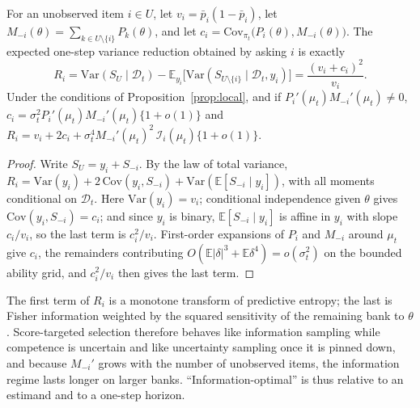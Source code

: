 \begin{proposition}\label{prop:evr}
For an unobserved item $i\in U$, let $v_i=\bar p_i(1-\bar p_i)$, let
$M_{-i}(\theta)=\sum_{k\in U\setminus\{i\}}P_k(\theta)$, and let
$c_i=\mathrm{Cov}_{\pi_t}\big(P_i(\theta),M_{-i}(\theta)\big)$. The expected one-step
variance reduction obtained by asking $i$ is exactly
\begin{equation}\label{eq:evr}
R_i=\mathrm{Var}(S_U\mid\mathcal D_t)-\mathbb E_{y_i}\big[\mathrm{Var}(S_{U\setminus\{i\}}\mid\mathcal D_t,y_i)\big]
=\frac{(v_i+c_i)^2}{v_i}.
\end{equation}
Under the conditions of Proposition~\ref{prop:local}, and if $P_i'(\mu_t)M_{-i}'(\mu_t)\neq0$,
$c_i=\sigma_t^2P_i'(\mu_t)M_{-i}'(\mu_t)\{1+o(1)\}$ and
$R_i=v_i+2c_i+\sigma_t^4M_{-i}'(\mu_t)^2\,\mathcal I_i(\mu_t)\{1+o(1)\}$.
\end{proposition}

\begin{proof}
Write $S_U=y_i+S_{-i}$. By the law of total variance,
$R_i=\mathrm{Var}(y_i)+2\,\mathrm{Cov}(y_i,S_{-i})+\mathrm{Var}(\mathbb E[S_{-i}\mid y_i])$, with
all moments conditional on $\mathcal D_t$. Here $\mathrm{Var}(y_i)=v_i$; conditional
independence given $\theta$ gives $\mathrm{Cov}(y_i,S_{-i})=c_i$; and since $y_i$ is binary,
$\mathbb E[S_{-i}\mid y_i]$ is affine in $y_i$ with slope $c_i/v_i$, so the last term is
$c_i^2/v_i$. First-order expansions of $P_i$ and $M_{-i}$ around $\mu_t$ give $c_i$, the
remainders contributing $O(\mathbb E|\delta|^3+\mathbb E\delta^4)=o(\sigma_t^2)$ on the
bounded ability grid, and $c_i^2/v_i$ then gives the last term.
\end{proof}

The first term of $R_i$ is a monotone transform of predictive entropy; the last is Fisher
information weighted by the squared sensitivity of the remaining bank to $\theta$.
Score-targeted selection therefore behaves like information sampling while competence is
uncertain and like uncertainty sampling once it is pinned down, and because $M_{-i}'$ grows
with the number of unobserved items, the information regime lasts longer on larger banks.
``Information-optimal'' is thus relative to an estimand and to a one-step horizon.
